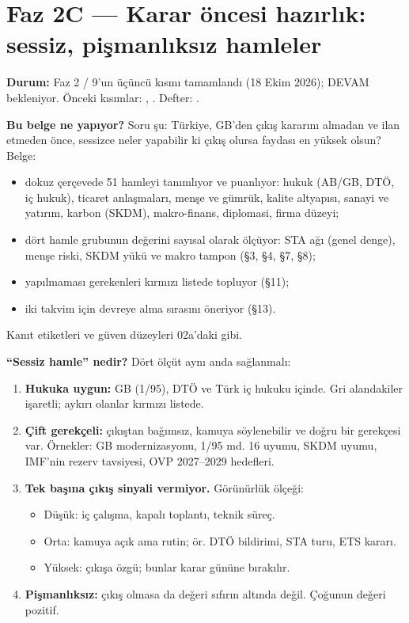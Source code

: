 \hypertarget{02c_hazirlik}{%
\chapter{Faz 2C --- Karar öncesi hazırlık: sessiz, pişmanlıksız hamleler}\label{02c_hazirlik}}

\textbf{Durum:} Faz 2 / 9'un üçüncü kısmı tamamlandı (18 Ekim 2026); DEVAM bekleniyor. Önceki kısımlar: , . Defter: .

\textbf{Bu belge ne yapıyor?} Soru şu: Türkiye, GB'den çıkış kararını almadan ve ilan etmeden önce, sessizce neler yapabilir ki çıkış olursa faydası en yüksek olsun? Belge:

\begin{itemize}
\tightlist
\item
  dokuz çerçevede 51 hamleyi tanımlıyor ve puanlıyor: hukuk (AB/GB, DTÖ, iç hukuk), ticaret anlaşmaları, menşe ve gümrük, kalite altyapısı, sanayi ve yatırım, karbon (SKDM), makro-finans, diplomasi, firma düzeyi;
\item
  dört hamle grubunun değerini sayısal olarak ölçüyor: STA ağı (genel denge), menşe riski, SKDM yükü ve makro tampon (§3, §4, §7, §8);
\item
  yapılmaması gerekenleri kırmızı listede topluyor (§11);
\item
  iki takvim için devreye alma sırasını öneriyor (§13).
\end{itemize}

Kanıt etiketleri ve güven düzeyleri 02a'daki gibi.

\textbf{``Sessiz hamle'' nedir?} Dört ölçüt aynı anda sağlanmalı:

\begin{enumerate}
\def\labelenumi{\arabic{enumi}.}
\tightlist
\item
  \textbf{Hukuka uygun:} GB (1/95), DTÖ ve Türk iç hukuku içinde. Gri alandakiler işaretli; aykırı olanlar kırmızı listede.
\item
  \textbf{Çift gerekçeli:} çıkıştan bağımsız, kamuya söylenebilir ve doğru bir gerekçesi var. Örnekler: GB modernizasyonu, 1/95 md. 16 uyumu, SKDM uyumu, IMF'nin rezerv tavsiyesi, OVP 2027--2029 hedefleri.
\item
  \textbf{Tek başına çıkış sinyali vermiyor.} Görünürlük ölçeği:

  \begin{itemize}
  \tightlist
  \item
    Düşük: iç çalışma, kapalı toplantı, teknik süreç.
  \item
    Orta: kamuya açık ama rutin; ör. DTÖ bildirimi, STA turu, ETS kararı.
  \item
    Yüksek: çıkışa özgü; bunlar karar gününe bırakılır.
  \end{itemize}
\item
  \textbf{Pişmanlıksız:} çıkış olmasa da değeri sıfırın altında değil. Çoğunun değeri pozitif.
\end{enumerate}

